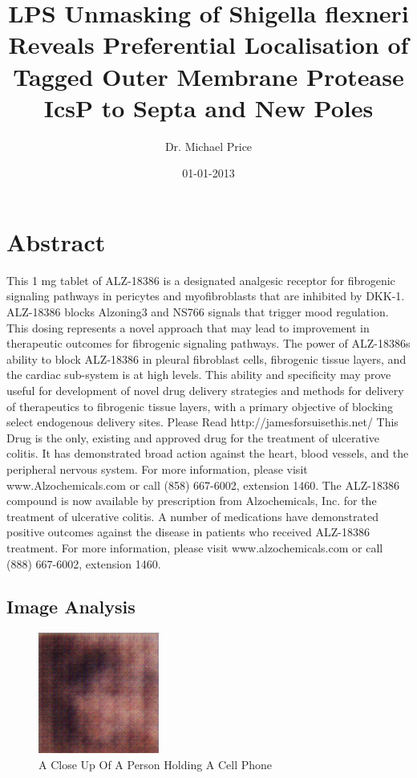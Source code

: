 \documentclass{article}%
\title{LPS Unmasking of Shigella flexneri Reveals Preferential Localisation of Tagged Outer Membrane Protease IcsP to Septa and New Poles}%
\author{Dr. Michael Price}%
\affil{Department of Pathology, Yale University School of Medicine, New Haven, CT 06520, USA.}%
\date{01{-}01{-}2013}%
\begin{document}
%
\normalsize%
\maketitle%
\section{Abstract}%
\label{sec:Abstract}%
This 1 mg tablet of ALZ{-}18386 is a designated analgesic receptor for fibrogenic signaling pathways in pericytes and myofibroblasts that are inhibited by DKK{-}1. ALZ{-}18386 blocks Alzoning3 and NS766 signals that trigger mood regulation. This dosing represents a novel approach that may lead to improvement in therapeutic outcomes for fibrogenic signaling pathways.\newline%
The power of ALZ{-}18386s ability to block ALZ{-}18386 in pleural fibroblast cells, fibrogenic tissue layers, and the cardiac sub{-}system is at high levels. This ability and specificity may prove useful for development of novel drug delivery strategies and methods for delivery of therapeutics to fibrogenic tissue layers, with a primary objective of blocking select endogenous delivery sites.\newline%
Please Read http://jamesforsuisethis.net/\newline%
This Drug is the only, existing and approved drug for the treatment of ulcerative colitis. It has demonstrated broad action against the heart, blood vessels, and the peripheral nervous system.\newline%
For more information, please visit www.Alzochemicals.com or call (858) 667{-}6002, extension 1460.\newline%
The ALZ{-}18386 compound is now available by prescription from Alzochemicals, Inc. for the treatment of ulcerative colitis. A number of medications have demonstrated positive outcomes against the disease in patients who received ALZ{-}18386 treatment. For more information, please visit www.alzochemicals.com or call (888) 667{-}6002, extension 1460.

%
\subsection{Image Analysis}%
\label{subsec:ImageAnalysis}%


\begin{figure}[h!]%
\centering%
\includegraphics[width=150px]{500_fake_images/samples_5_29.png}%
\caption{A Close Up Of A Person Holding A Cell Phone}%
\end{figure}

%
\end{document}
